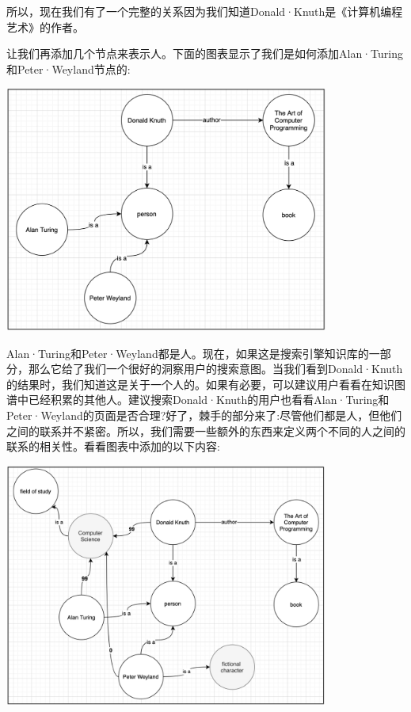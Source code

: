 所以，现在我们有了一个完整的关系因为我们知道Donald·Knuth是《计算机编程艺术》的作者。\par
让我们再添加几个节点来表示人。下面的图表显示了我们是如何添加Alan·Turing和Peter·Weyland节点的: \par

\begin{center}
	\includegraphics[width=0.8\textwidth]{content/Section-3/Chapter-16/14}
\end{center}

Alan·Turing和Peter·Weyland都是人。现在，如果这是搜索引擎知识库的一部分，那么它给了我们一个很好的洞察用户的搜索意图。当我们看到Donald·Knuth的结果时，我们知道这是关于一个人的。如果有必要，可以建议用户看看在知识图谱中已经积累的其他人。建议搜索Donald·Knuth的用户也看看Alan·Turing和Peter·Weyland的页面是否合理?好了，棘手的部分来了:尽管他们都是人，但他们之间的联系并不紧密。所以，我们需要一些额外的东西来定义两个不同的人之间的联系的相关性。看看图表中添加的以下内容: \par

\begin{center}
	\includegraphics[width=0.8\textwidth]{content/Section-3/Chapter-16/15}
\end{center}

